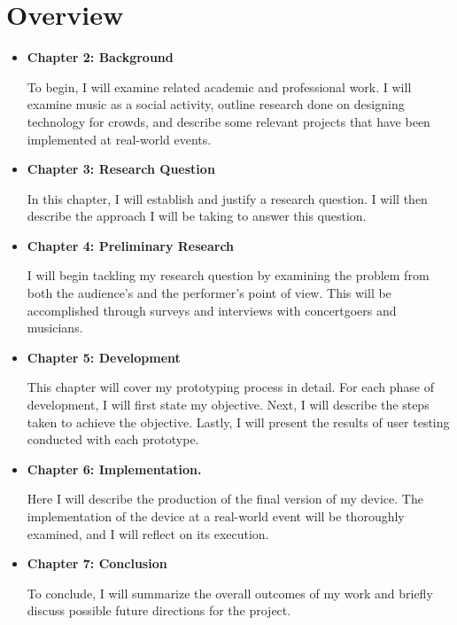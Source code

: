 \section{Overview}

\begin{itemize}
	\item \textbf{Chapter 2: Background}
	
	To begin, I will examine related academic and professional work. I will examine music as a social activity, outline research done on designing technology for crowds, and describe some relevant projects that have been implemented at real-world events.
	
	\item \textbf{Chapter 3: Research Question}
	
	In this chapter, I will establish and justify a research question. I will then describe the approach I will be taking to answer this question.
	
	\item \textbf{Chapter 4: Preliminary Research}
	
	I will begin tackling my research question by examining the problem from both the audience's and the performer's point of view. This will be accomplished through surveys and interviews with concertgoers and musicians.
		
	\item \textbf{Chapter 5: Development}
	
	This chapter will cover my prototyping process in detail. For each phase of development, I will first state my objective. Next, I will describe the steps taken to achieve the objective. Lastly, I will present the results of user testing conducted with each prototype.
		
	\item \textbf{Chapter 6: Implementation.}
	
	Here I will describe the production of the final version of my device. The implementation of the device at a real-world event will be thoroughly examined, and I will reflect on its execution.
	
	\item \textbf{Chapter 7: Conclusion}
	
	To conclude, I will summarize the overall outcomes of my work and briefly discuss possible future directions for the project.
\end{itemize}
